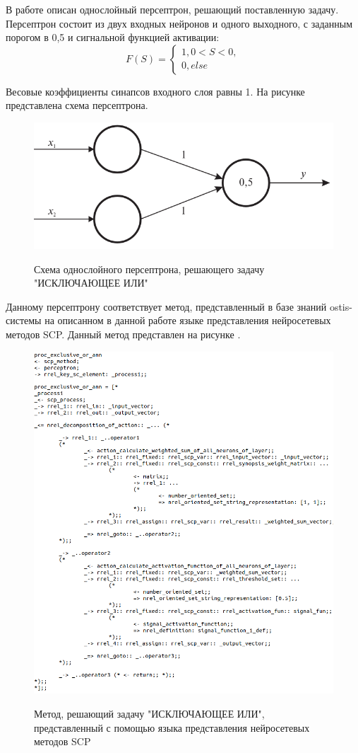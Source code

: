 В работе  описан однослойный персептрон, решающий поставленную задачу. Персептрон состоит из двух входных нейронов и одного выходного, с заданным порогом в 0,5 и сигнальной функцией активации:
\begin{equation*}
	F(S) =
	\begin{cases}
		1, 0 < S < 0,\\
		0, else
	\end{cases}
\end{equation*}

Весовые коэффициенты синапсов входного слоя равны 1. На рисунке \textit{} представлена схема персептрона.

\begin{figure}
	\centering
	\caption{Схема однослойного персептрона, решающего задачу "ИСКЛЮЧАЮЩЕЕ ИЛИ"{}}
	\includegraphics[width=0.5\linewidth]{author/part3/figures/strong_or_ann.png}
	\label{fig:strong_or_ann}
\end{figure}

Данному персептрону соответствует метод, представленный в базе знаний ostis-системы на описанном в данной работе языке представления нейросетевых методов SCP. Данный метод представлен на рисунке \textit{}.

\begin{figure}
	\centering
	\caption{Метод, решающий задачу "ИСКЛЮЧАЮЩЕЕ ИЛИ"{}, представленный с помощью языка представления нейросетевых методов SCP}
	\includegraphics[width=0.95\linewidth]{author/part3/figures/exclusive_or_ann_scp.png}
	\label{fig:exclusive_or_ann_scp}
\end{figure}

